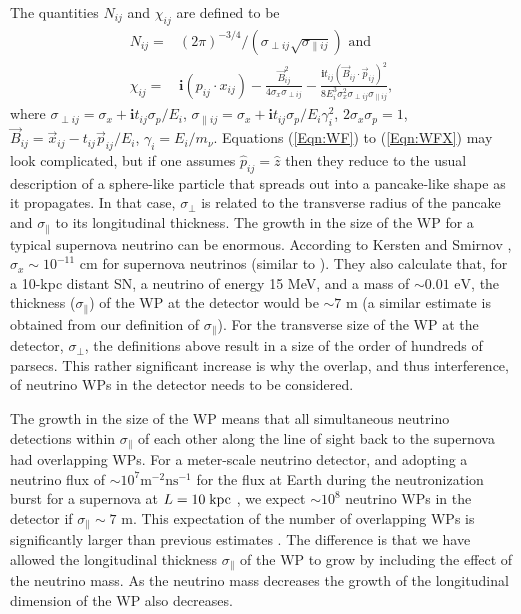 \documentclass[aps,prl,reprint,floatfix
]{revtex4-1}
\begin{document}
The quantities $N_{ij}$ and $\chi_{ij}$ are defined to be 
\begin{align}
	N_{ij}=&\left(2\pi\right)^{-3/4}/\left(\sigma_
    		{\perp ij}\sqrt{\sigma_{\parallel ij}}\right)
    	\label{Eqn:WFN}\text{ and}\\
    \chi_{ij}=&
        \bm{i}\left(p_{ij}\cdot x_{ij}\right)
		-\frac{\vec{B}_{ij}^2}{4\sigma_x\sigma_{\perp ij}}
		-\frac{\bm{i}t_{ij}\left(\vec{B}_{ij}\cdot\vec{p}_{ij}\right)^2}
		{8E_i^3\sigma_x^2\sigma_{\perp ij}\sigma_{\parallel ij}}
        \label{Eqn:WFX},
\end{align}
where  
$\sigma_{\perp ij}=\sigma_x+\bm{i}t_{ij}\sigma_p/E_i$, 
$\sigma_{\parallel ij}=\sigma_x+\bm{i}t_{ij}\sigma_p/E_i \gamma_i^2$, 
$2\sigma_x\sigma_p=1$, 
$\vec{B}_{ij}=\vec{x}_{ij}-t_{ij} \vec{p}_{ij}/E_i$, 
$\gamma_i=E_i/m_{\nu}$. Equations (\ref{Eqn:WF}) to (\ref{Eqn:WFX}) may look complicated, but if one assumes $\hat{p}_{ij}=\hat{z}$ then they reduce to the usual description of a sphere-like particle that spreads out into a pancake-like shape as it propagates. In that case, $\sigma_\perp$ is related to the transverse radius of the pancake and $\sigma_\parallel$ to its longitudinal thickness. The growth in the size of the WP for a typical supernova neutrino can be enormous. According to Kersten and Smirnov \cite{2016EPJC...76..339K}, $\sigma_x\sim10^{-11}\text{ cm}$ for supernova neutrinos (similar to \cite{2017arXiv170208338A}). They also calculate that, for a 10-kpc distant SN, a neutrino of energy 15 MeV, and a mass of $\sim0.01\text{ eV}$, the thickness ($\sigma_\parallel$) of the WP at the detector would be $\sim7\text{ m}$ (a similar estimate is obtained from our definition of $\sigma_\parallel$). For the transverse size of the WP at the detector, $\sigma_\perp$, the definitions above result in a size of the order of hundreds of parsecs. This rather significant increase is why the overlap, and thus interference, of neutrino WPs in the detector needs to be considered.

The growth in the size of the WP means that all simultaneous neutrino detections within $\sigma_{\parallel}$ of each other along the line of sight back to the supernova had overlapping WPs. For a meter-scale neutrino detector, and adopting a neutrino flux of $\sim10^{7}\text{m}^{-2}\text{ns}^{-1}$ for the flux at Earth during the neutronization burst for a supernova at $L=10\;{\rm kpc}$ \cite{2016ApJ...817..182W}, we expect $\sim10^{8}$ neutrino WPs in the detector if $\sigma_{\parallel} \sim7\text{ m}$. This expectation of the number of overlapping WPs is significantly larger than previous estimates \cite{2016arXiv160500344L}. The difference is that we have allowed the longitudinal thickness $\sigma_{\parallel}$ of the WP to grow by including the effect of the neutrino mass. As the neutrino mass decreases the growth of the longitudinal dimension of the WP also decreases. 
\end{document}
